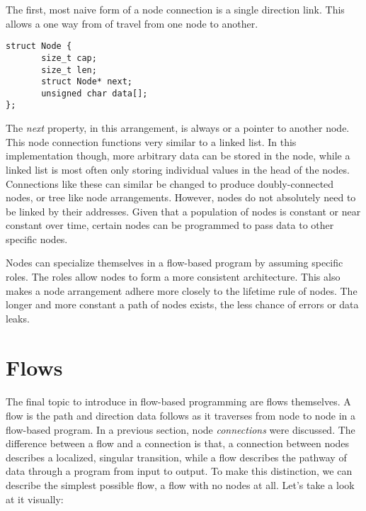 \par The first, most naive form of a node connection is a single direction link. This allows a one way from of travel from one node to another.

\begin{lstlisting}[style=customc]
struct Node {
       size_t cap;
       size_t len;
       struct Node* next;
       unsigned char data[];
};
\end{lstlisting}

\par The \emph{next} property, in this arrangement, is always  or a pointer to another node. This node connection functions very similar to a linked list. In this implementation though, more arbitrary data can be stored in the node, while a linked list is most often only storing individual values in the head of the nodes. Connections like these can similar be changed to produce doubly-connected nodes, or tree like node arrangements. However, nodes do not absolutely need to be linked by their addresses. Given that a population of nodes is constant or near constant over time, certain nodes can be programmed to pass data to other specific nodes.

\par Nodes can specialize themselves in a flow-based program by assuming specific roles. The roles allow nodes to form a more consistent architecture. This also makes a node arrangement adhere more closely to the lifetime rule of nodes. The longer and more constant a path of nodes exists, the less chance of errors or data leaks.

\section{Flows}

\paragraph{  } The final topic to introduce in flow-based programming are flows themselves. A flow is  the path and direction data follows as it traverses from node to node in a flow-based program. In a previous section, node \emph{connections} were discussed. The difference between a flow and a connection is that, a connection between nodes describes a localized, singular transition, while a flow describes the pathway of data through a program from input to output. To make this distinction, we can describe the simplest possible flow,  a flow with no nodes at all. Let's take a look at it visually:


